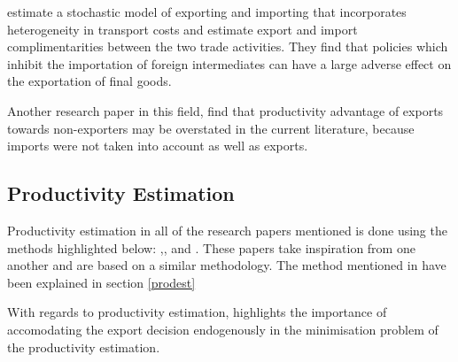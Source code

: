 \documentclass[12pt]{article}
\begin{document}
\textcite{kasahara2013productivity} estimate a stochastic model of
exporting and importing that incorporates heterogeneity in transport
costs and estimate export and import complimentarities between the two
trade activities. They find that policies which inhibit the
importation of  foreign intermediates can have a large adverse 
effect on the exportation of final goods.  

Another research paper in this field, \textcite{muuls2009imports} find
that productivity advantage of exports towards non-exporters
may be overstated in the current literature, 
because imports were not taken into account as well as exports.
\subsection*{Productivity Estimation}
Productivity estimation in all of the research papers mentioned is done using
the methods highlighted below:
\textcite{olley1992dynamics},\textcite{levinsohn2003estimating},
\textcite{ackerberg2006structural} and \textcite{wooldridge2009estimating}. 
These papers take inspiration from one another and are based on a
similar methodology. The method
mentioned in \textcite{olley1992dynamics}
have been explained in section \ref{prodest}

With regards to productivity estimation, \textcite{de2013detecting} highlights the importance of accomodating
the export decision endogenously in the minimisation problem of the productivity
estimation. 
\end{document}
